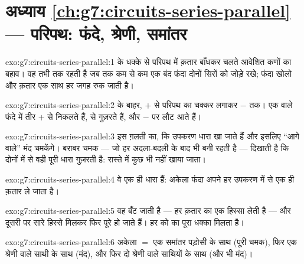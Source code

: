 \section*{अध्याय \ref{ch:g7:circuits-series-parallel} --- परिपथ: फंदे, श्रेणी, समांतर}

\begin{solution}{exo:g7:circuits-series-parallel:1}
 के धक्के से परिपथ में क़तार बाँधकर चलते आवेशित कणों का बहाव। वह
तभी तक रहती है जब तक कम से कम एक बंद फंदा दोनों सिरों को जोड़े रखे;
फंदा खोलो और क़तार एक साथ हर जगह रुक जाती है।
\end{solution}

\begin{solution}{exo:g7:circuits-series-parallel:2}
 के बाहर, $+$ से परिपथ का चक्कर लगाकर $-$ तक। एक  वाले फंदे
में तीर $+$ से निकलते हैं,  से गुज़रते हैं, और $-$ पर लौट आते
हैं।
\end{solution}

\begin{solution}{exo:g7:circuits-series-parallel:3}
इस ग़लती का, कि उपकरण धारा खा जाते हैं और इसलिए ``आगे वाले''  मंद
चमकेंगे। बराबर चमक --- जो हर अदला-बदली के बाद भी बनी रहती है ---
दिखाती है कि दोनों में से वही पूरी धारा गुज़रती है: रास्ते में कुछ भी
नहीं खाया जाता।
\end{solution}

\begin{solution}{exo:g7:circuits-series-parallel:4}
वे एक ही धारा हैं: अकेला फंदा अपने हर उपकरण में से एक ही क़तार ले जाता
है।
\end{solution}

\begin{solution}{exo:g7:circuits-series-parallel:5}
वह बँट जाती है --- हर  क़तार का एक हिस्सा लेती है --- और दूसरी
 पर सारे हिस्से मिलकर फिर पूरे हो जाते हैं। हर  को  का
पूरा धक्का मिलता है।
\end{solution}

\begin{solution}{exo:g7:circuits-series-parallel:6}
अकेला $=$ एक समांतर पड़ोसी के साथ (पूरी चमक), फिर एक श्रेणी वाले साथी
के साथ (मंद), और फिर दो श्रेणी वाले साथियों के साथ (और भी मंद)।
\end{solution}

